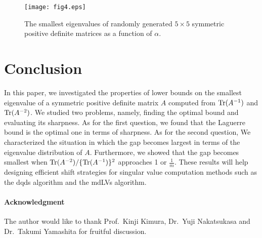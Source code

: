 \documentclass{amsart}
\begin{document}
\begin{figure}[h]
\centerline{\texttt{[image: fig4.eps]}}
\caption{The smallest eigenvalues of randomly generated $5\times 5$ symmetric positive definite matrices as a function of $\alpha$.}
\label{fig:fig4}
\end{figure}

\section{Conclusion}
In this paper, we investigated the properties of lower bounds on the smallest eigenvalue of a symmetric positive definite matrix $A$ computed from ${\rm Tr}(A^{-1})$ and ${\rm Tr}(A^{-2})$. We studied two problems, namely, finding the optimal bound and evaluating its sharpness. As for the first question, we found that the Laguerre bound is the optimal one in terms of sharpness. As for the second question, We characterized the situation in which the gap becomes largest in terms of the eigenvalue distribution of $A$. Furthermore, we showed that the gap becomes smallest when ${\rm Tr}(A^{-2})/\{{\rm Tr}(A^{-1})\}^2$ approaches 1 or $\frac{1}{m}$. These results will help designing efficient shift strategies for singular value computation methods such as the dqds algorithm and the mdLVs algorithm.

\paragraph{\bf Acknowledgment}
The author would like to thank Prof.~Kinji Kimura, Dr.~Yuji Nakatsukasa and Dr.~Takumi Yamashita for fruitful discussion.
\end{document}
